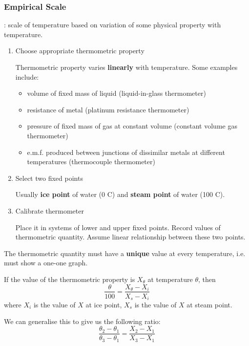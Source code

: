 \subsubsection{Empirical Scale}
: scale of temperature based on variation of some physical property with temperature.
\begin{enumerate}
\item Choose appropriate thermometric property

Thermometric property varies \textbf{linearly} with temperature. Some examples include: 
    \begin{itemize}
    \item volume of fixed mass of liquid (liquid-in-glass thermometer)
    \item resistance of metal (platinum resistance thermometer)
    \item pressure of fixed mass of gas at constant volume (constant volume gas thermometer)
    \item e.m.f. produced between junctions of dissimilar metals at different temperatures (thermocouple thermometer)
    \end{itemize}

\item Select two fixed points

Usually \textbf{ice point} of water (0 \degree C) and \textbf{steam point} of water (100 \degree C).

\item Calibrate thermometer

Place it in systems of lower and upper fixed points. Record values of thermometric quantity. Assume linear relationship between these two points.
\end{enumerate}

\begin{remark}
The thermometric quantity must have a \textbf{unique} value at every temperature, i.e. must show a one-one graph.
\end{remark}

If the value of the thermometric property is $X_{\theta}$ at temperature $\theta$, then
\begin{equation}
\frac{\theta}{100} = \frac{X_{\theta}-X_i}{X_s-X_i}
\end{equation}
where $X_i$ is the value of $X$ at ice point, $X_s$ is the value of $X$ at steam point.

We can generalise this to give us the following ratio:
\begin{equation}
\frac{\theta_2-\theta_1}{\theta_3-\theta_1} = \frac{X_2-X_1}{X_3-X_1}
\end{equation}

